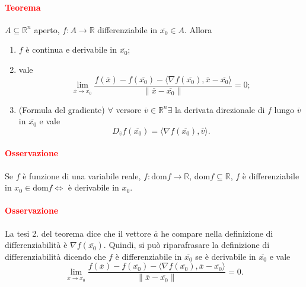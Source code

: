 \documentclass{article}
\newcommand{\R}{\mathbb{R}}
\newcommand{\dom}{\text{dom}}
\begin{document}
\paragraph{\textcolor{red}{Teorema}}
$A\subseteq\R^n$ aperto, $f:A\rightarrow\R$ differenziabile in $\overline{x_0}\in A$. Allora 
\begin{enumerate}
    \item $f$ è continua e derivabile in $\overline{x_0}$;
    \item vale 
    \begin{equation*}
         \lim_{\overline{x}\rightarrow\overline{x_0}}\frac{f(\overline{x})-f(\overline{x_0})-\langle \nabla f(\overline{x_0}),\overline{x}-\overline{x_0}\rangle}{\|\overline{x}-\overline{x_0}\|}=0;
    \end{equation*}
    \item (Formula del gradiente) $\forall$ versore $\overline{v}\in\R^n\exists$ la derivata direzionale di $f$ lungo $\overline{v}$ in $\overline{x_0}$ e vale
    \begin{equation*}
        D_{\overline{v}}f(\overline{x_0})=\langle \nabla f(\overline{x_0}), \overline{v} \rangle.
    \end{equation*}
\end{enumerate}

\paragraph{\textcolor{red}{Osservazione}}
Se $f$ è funzione di una variabile reale, $f: \dom f\rightarrow\R$, $\dom f \subseteq\R$, $f$ è differenziabile in $x_0\in \dom f \Leftrightarrow$ è derivabile in $x_0$.

\paragraph{\textcolor{red}{Osservazione}}
La tesi 2. del teorema dice che il vettore $\overline{a}$ he compare nella definizione di differenziabilità è $\nabla f(\overline{x_0})$. Quindi, si può riparafrasare la definizione di differenziabilità dicendo che $f$ è differenziabile in $\overline{x_0}$ se è derivabile in $\overline{x_0}$ e vale 
\begin{equation*}
         \lim_{\overline{x}\rightarrow\overline{x_0}}\frac{f(\overline{x})-f(\overline{x_0})-\langle \nabla f(\overline{x_0}),\overline{x}-\overline{x_0}\rangle}{\|\overline{x}-\overline{x_0}\|}=0.
\end{equation*}
\end{document}
